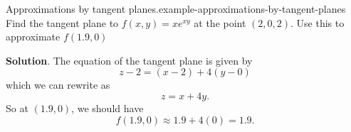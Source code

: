 \documentclass[10pt,]{book}
\numberwithin{equation}{section}
\begin{document}
\begin{example}{Approximations by tangent planes.}{example-approximations-by-tangent-planes}%
\hypertarget{p-1373}{}%
Find the tangent plane to \(f(x,y) = xe^{xy}\) at the point \((2,0,2)\). Use this to approximate \(f(1.9,0)\)%
\par\smallskip%
\noindent\textbf{Solution}.\hypertarget{solution-221}{}\quad%
\hypertarget{p-1374}{}%
The equation of the tangent plane is given by%
\begin{equation*}
z - 2 = (x - 2) + 4(y - 0)
\end{equation*}
which we can rewrite as%
\begin{equation*}
z = x + 4y.
\end{equation*}
So at \((1.9,0)\), we should have%
\begin{equation*}
f(1.9,0)\approx 1.9 + 4(0) = 1.9.
\end{equation*}
%
\end{example}
%
%
\typeout{************************************************}
\typeout{************************************************}
%
\end{document}
